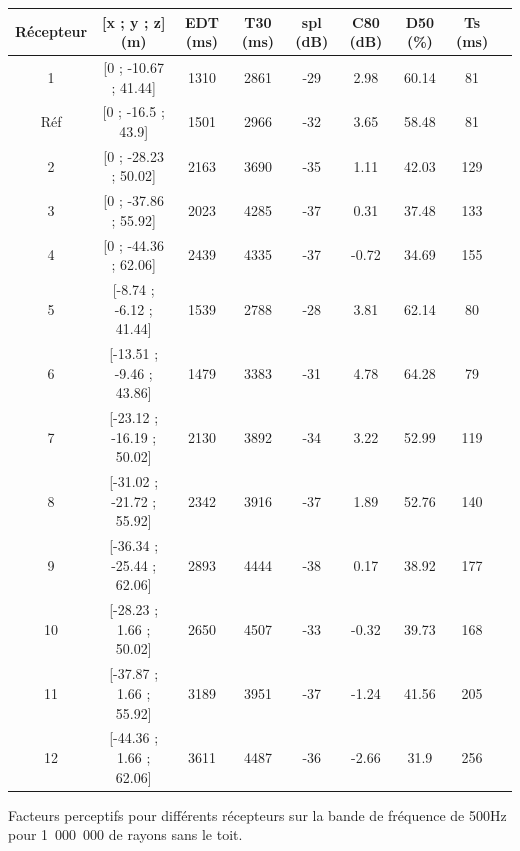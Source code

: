  \begin{tableth} 
\footnotesize
 \begin{tabular}{| *{9}{c|}} 
 \hline 
 Récepteur & [x ; y ; z] (m)  & \gls{EDT} (ms) & \gls{T30} (ms) & \gls{spl} (dB) & \gls{C80} (dB) & \gls{D50} (\%) & \gls{Ts} (ms) \\ %
 \hline 
 \hline 
1  & [0 ; -10.67 ; 41.44] &1310  &2861   &-29  &2.98  &60.14  &81 \\%
 \hline 
 Réf    &[0 ; -16.5 ; 43.9] &1501  &2966   &-32  &3.65  &58.48  &81 \\%
 \hline 
 2  & [0 ; -28.23 ; 50.02] &2163  &3690   &-35  &1.11  &42.03  &129 \\ %
 \hline 
 3  &  [0 ; -37.86 ; 55.92] &2023  &4285   &-37  &0.31  &37.48  &133 \\ %
 \hline 
 4  &  [0 ; -44.36 ; 62.06] &2439  &4335   &-37  &-0.72  &34.69  &155 \\%
 \hline 
 \hline
 5  &   [-8.74 ; -6.12 ; 41.44] &1539  &2788   &-28  &3.81  &62.14  &80 \\%
 \hline 
 6  &  [-13.51 ; -9.46 ; 43.86] &1479  &3383   &-31  &4.78  &64.28  &79 \\%
  \hline 
  7 &   [-23.12 ; -16.19 ; 50.02] &2130  &3892   &-34  &3.22  &52.99  &119 \\ %
 \hline 
 8  &  [-31.02 ; -21.72 ; 55.92] &2342  &3916   &-37  &1.89  &52.76  &140 \\ %
 \hline 
 9  & [-36.34 ; -25.44 ; 62.06] &2893  &4444   &-38  &0.17  &38.92  &177 \\ %
 \hline 
 \hline
 10  &  [-28.23 ; 1.66 ; 50.02] &2650  &4507   &-33  &-0.32  &39.73  &168 \\ %
 \hline 
11   & [-37.87 ; 1.66 ; 55.92] &3189  & 3951  &-37  & -1.24 &41.56  &205 \\%
 \hline 
12   & [-44.36 ; 1.66 ; 62.06] &3611  & 4487  & -36 &-2.66  &31.9  & 256\\ %
 \hline 
\end{tabular} 
 \caption{Facteurs perceptifs pour différents récepteurs sur la bande de fréquence de 500Hz pour 1~000~000 de rayons sans le toit.} 
 \label{tab_fac_listener_sansToit} 
 \end{tableth}


 
 